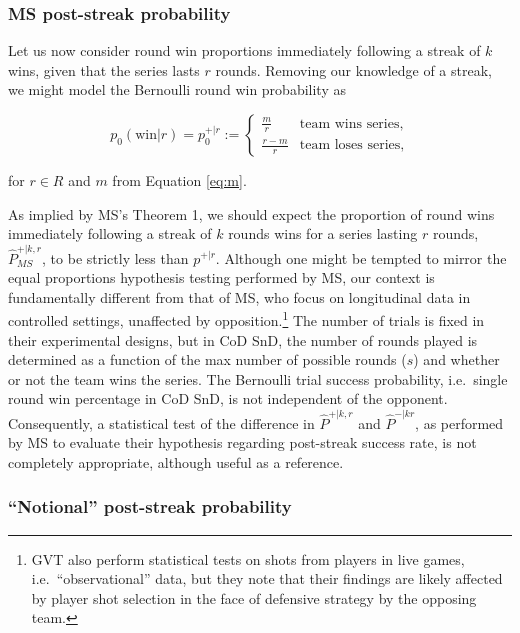 \documentclass{article}
\begin{document}
\hypertarget{ms-post-streak-probability}{%
\subsubsection{MS post-streak
probability}\label{ms-post-streak-probability}}

Let us now consider round win proportions immediately following a streak
of \(k\) wins, given that the series lasts \(r\) rounds. Removing our
knowledge of a streak, we might model the Bernoulli round win
probability as

\begin{equation}\label{eq:pwr}
p_0(\text{win} | r) = p^{+|r}_0 := \begin{cases} 
  \frac{m}{r} & \text{team wins series}, \\ 
  \frac{r - m}{r} & \text{team loses series},
\end{cases}
\end{equation}

for \(r \in R\) and \(m\) from Equation \ref{eq:m}.

As implied by MS's Theorem 1, we should expect the proportion of round
wins immediately following a streak of \(k\) rounds wins for a series
lasting \(r\) rounds, \(\hat{P}^{+|k,r}_{MS}\), to be strictly less than
\(p^{+|r}\). Although one might be tempted to mirror the equal
proportions hypothesis testing performed by MS, our context is
fundamentally different from that of MS, who focus on longitudinal data
in controlled settings, unaffected by opposition.\footnote{GVT also
  perform statistical tests on shots from players in live games,
  i.e.~``observational'' data, but they note that their findings are
  likely affected by player shot selection in the face of defensive
  strategy by the opposing team.} The number of trials is fixed in their
experimental designs, but in CoD SnD, the number of rounds played is
determined as a function of the max number of possible rounds (\(s\))
and whether or not the team wins the series. The Bernoulli trial success
probability, i.e.~single round win percentage in CoD SnD, is not
independent of the opponent. Consequently, a statistical test of the
difference in \(\hat{P}^{+|k,r}\) and \(\hat{P}^{-|kr}\), as performed
by MS to evaluate their hypothesis regarding post-streak success rate,
is not completely appropriate, although useful as a reference.

\hypertarget{notional-post-streak-probability}{%
\subsubsection{``Notional'' post-streak
probability}\label{notional-post-streak-probability}}
\end{document}
